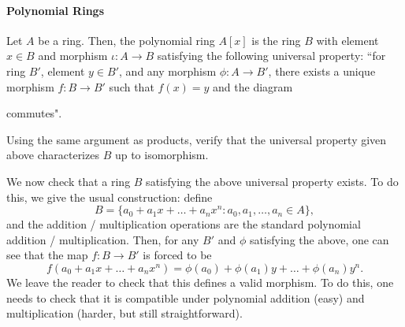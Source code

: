 \paragraph{Polynomial Rings}
Let $A$ be a ring. Then, the polynomial ring $A[x]$
is the ring $B$ with element $x\in B$ and morphism 
$\iota : A\to B$ satisfying the following 
universal property: ``for ring $B'$, element $y\in B'$, 
and any morphism $\phi : A\to B'$,
there exists a unique morphism $f : B\to B'$
such that $f(x)=y$ and the diagram 
\begin{center}
\end{center}
commutes".
\begin{exercise}
Using the same argument as products, 
verify that the universal property given above 
characterizes $B$ up to isomorphism.
\end{exercise}
We now check that a ring $B$ satisfying the above universal 
property exists. 
To do this, we give the usual construction: define 
$$B = \{a_0 + a_1x + \dots + a_nx^n : 
a_0,a_1,\dots,a_n\in A\},$$
and the addition / multiplication operations 
are the standard polynomial addition / multiplication.
Then, for any $B'$ and $\phi$ satisfying the above,
one can see that the map $f : B\to B'$ is forced to be
$$f(a_0 + a_1x + \dots + a_nx^n)
= \phi(a_0) + \phi(a_1)y + \dots + \phi(a_n)y^n.$$
We leave the reader to check that this defines 
a valid morphism.
To do this, one needs to check that it is compatible 
under polynomial addition (easy) and multiplication
(harder, but still straightforward).
